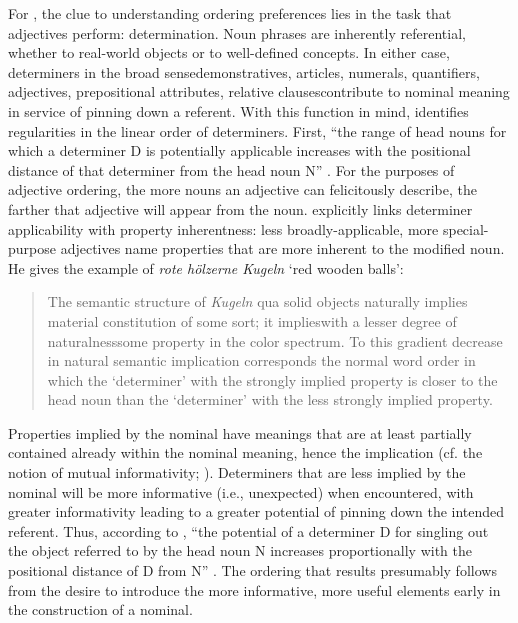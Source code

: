 \documentclass{sp}
\begin{document}
For \cite{seiler1978}, the clue to understanding ordering preferences lies in the task that adjectives perform: determination. Noun phrases are inherently referential, whether to real-world objects or to well-defined concepts. In either case, determiners in the broad sense\dash demonstratives, articles, numerals, quantifiers, adjectives, prepositional attributes, relative clauses\dash contribute to nominal meaning in service of pinning down a referent. With this function in mind, \citeauthor{seiler1978} identifies regularities in the linear order of determiners. First, ``the range of head nouns for which a determiner D is potentially applicable increases with the positional distance of that determiner from the head noun N'' . For the purposes of adjective ordering, the more nouns an adjective can felicitously describe, the farther that adjective will appear from the noun. \citeauthor{seiler1978} explicitly links determiner applicability with property inherentness: less broadly-applicable, more special-purpose adjectives name properties that are more inherent to the modified noun. He gives the example of \emph{rote h\"{o}lzerne Kugeln} `red wooden balls':

\begin{quotation}The semantic structure of \emph{Kugeln} qua solid objects naturally implies material constitution of some sort; it implies\dash with a lesser degree of naturalness\dash some property in the color spectrum. To this gradient decrease in natural semantic implication corresponds the normal word order in which the `determiner' with the strongly implied property is closer to the head noun than the `determiner' with the less strongly implied property. \end{quotation}

Properties implied by the nominal have meanings that are at least partially contained already within the nominal meaning, hence the implication (cf. the notion of mutual informativity; \citealp{futrell2017}). Determiners that are less implied by the nominal will be more informative (i.e., unexpected) when encountered, with greater informativity leading to a greater potential of pinning down the intended referent.  Thus, according to \citeauthor{seiler1978}, ``the potential of a determiner D for singling out the object referred to by the head noun N increases proportionally with the positional distance of D from N'' . The ordering that results presumably follows from the desire to introduce the more informative, more useful elements early in the construction of a nominal.
\end{document}
